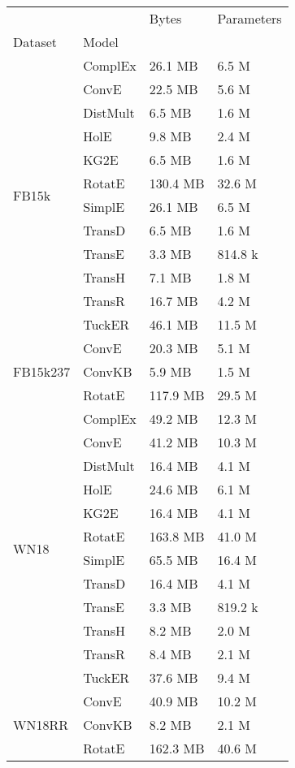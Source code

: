\begin{tabular}{llll}
\toprule
       &        &     Bytes & Parameters \\
Dataset & Model &           &            \\
\midrule
\multirow{12}{*}{FB15k} & ComplEx &   26.1 MB &      6.5 M \\
       & ConvE &   22.5 MB &      5.6 M \\
       & DistMult &    6.5 MB &      1.6 M \\
       & HolE &    9.8 MB &      2.4 M \\
       & KG2E &    6.5 MB &      1.6 M \\
       & RotatE &  130.4 MB &     32.6 M \\
       & SimplE &   26.1 MB &      6.5 M \\
       & TransD &    6.5 MB &      1.6 M \\
       & TransE &    3.3 MB &    814.8 k \\
       & TransH &    7.1 MB &      1.8 M \\
       & TransR &   16.7 MB &      4.2 M \\
       & TuckER &   46.1 MB &     11.5 M \\
\cline{1-4}
\multirow{3}{*}{FB15k237} & ConvE &   20.3 MB &      5.1 M \\
       & ConvKB &    5.9 MB &      1.5 M \\
       & RotatE &  117.9 MB &     29.5 M \\
\cline{1-4}
\multirow{12}{*}{WN18} & ComplEx &   49.2 MB &     12.3 M \\
       & ConvE &   41.2 MB &     10.3 M \\
       & DistMult &   16.4 MB &      4.1 M \\
       & HolE &   24.6 MB &      6.1 M \\
       & KG2E &   16.4 MB &      4.1 M \\
       & RotatE &  163.8 MB &     41.0 M \\
       & SimplE &   65.5 MB &     16.4 M \\
       & TransD &   16.4 MB &      4.1 M \\
       & TransE &    3.3 MB &    819.2 k \\
       & TransH &    8.2 MB &      2.0 M \\
       & TransR &    8.4 MB &      2.1 M \\
       & TuckER &   37.6 MB &      9.4 M \\
\cline{1-4}
\multirow{3}{*}{WN18RR} & ConvE &   40.9 MB &     10.2 M \\
       & ConvKB &    8.2 MB &      2.1 M \\
       & RotatE &  162.3 MB &     40.6 M \\
\bottomrule
\end{tabular}


